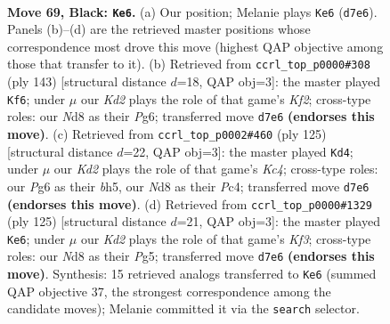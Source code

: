 \documentclass[11pt]{article}
\begin{document}
\clearpage

\begin{figure}[p]\centering
\begin{subfigure}{0.46\textwidth}\centering
\resizebox{\linewidth}{!}{%
\newchessgame
\chessboard[
  setfen={3n4/3k2p1/1p4p1/p1pp4/8/KPP5/8/8 b - - 2 69},
  showmover=false,
  pgfstyle=straightmove, color=movearrow, markmove={d7-e6}
]}
\caption{}
\end{subfigure}\hfill
\begin{subfigure}{0.46\textwidth}\centering
\resizebox{\linewidth}{!}{%
\newchessgame
\chessboard[
  setfen={8/5k2/p5p1/1p3p1p/1P3P1P/P3K3/8/8 b - - 17 72},
  showmover=false,
  pgfstyle=straightmove, color=movearrow, markmove={f7-f6}
]}
\caption{}
\end{subfigure}
\\[4pt]
\begin{subfigure}{0.46\textwidth}\centering
\resizebox{\linewidth}{!}{%
\newchessgame
\chessboard[
  setfen={8/7p/8/p1k4B/Ppp5/8/1PK5/8 b - - 19 63},
  showmover=false,
  pgfstyle=straightmove, color=movearrow, markmove={c5-d4}
]}
\caption{}
\end{subfigure}\hfill
\begin{subfigure}{0.46\textwidth}\centering
\resizebox{\linewidth}{!}{%
\newchessgame
\chessboard[
  setfen={8/1p6/2p2k1p/2P3p1/1P1K2P1/8/7P/8 b - - 8 63},
  showmover=false,
  pgfstyle=straightmove, color=movearrow, markmove={f6-e6}
]}
\caption{}
\end{subfigure}
\caption{\textbf{Move 69, Black: \texttt{Ke6}.} (a) Our position; Melanie plays \texttt{Ke6} (\texttt{d7e6}). Panels (b)--(d) are the retrieved master positions whose correspondence most drove this move (highest QAP objective among those that transfer to it). (b) Retrieved from \texttt{ccrl\_top\_p0000\#308} (ply 143) [structural distance $d$=18, QAP obj=3]: the master played \texttt{Kf6}; under $\mu$ our \emph{Kd2} plays the role of that game's \emph{Kf2}; cross-type roles: our \emph{N}d8 as their \emph{P}g6; transferred move \texttt{d7e6} \textbf{(endorses this move)}. (c) Retrieved from \texttt{ccrl\_top\_p0002\#460} (ply 125) [structural distance $d$=22, QAP obj=3]: the master played \texttt{Kd4}; under $\mu$ our \emph{Kd2} plays the role of that game's \emph{Kc4}; cross-type roles: our \emph{P}g6 as their \emph{b}h5, our \emph{N}d8 as their \emph{P}c4; transferred move \texttt{d7e6} \textbf{(endorses this move)}. (d) Retrieved from \texttt{ccrl\_top\_p0000\#1329} (ply 125) [structural distance $d$=21, QAP obj=3]: the master played \texttt{Ke6}; under $\mu$ our \emph{Kd2} plays the role of that game's \emph{Kf3}; cross-type roles: our \emph{N}d8 as their \emph{P}g5; transferred move \texttt{d7e6} \textbf{(endorses this move)}. Synthesis: 15 retrieved analogs transferred to \texttt{Ke6} (summed QAP objective 37, the strongest correspondence among the candidate moves); Melanie committed it via the \texttt{search} selector.}
\label{fig:thought-m137}
\end{figure}
\end{document}
